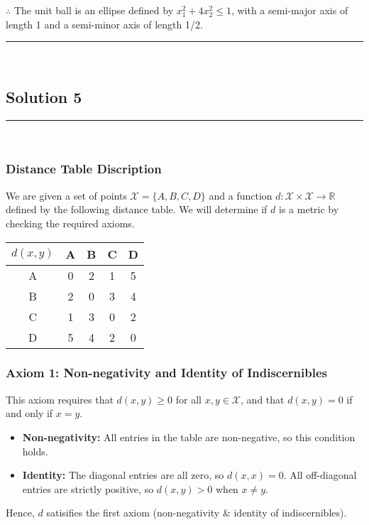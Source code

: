 \documentclass{article}
\begin{document}
\subsubsection*{\normalfont}{$\therefore$ The unit ball is an ellipse defined by $x_1^2 + 4x_2^2 \le 1$, with a semi-major axis of length 1 and a semi-minor axis of length 1/2.}

\noindent\rule{\textwidth}{0.4pt}\\

\newpage

\subsection*{Solution 5}
\noindent\rule{\textwidth}{0.4pt}\\
\subsubsection*{Distance Table Discription}
\parbox{\textwidth}{
We are given a set of points $\mathcal{X}=\{A, B, C, D\}$ and a function $d: \mathcal{X} \times \mathcal{X} \to \mathbb{R}$ defined by the following distance table. We will determine if $d$ is a metric by checking the required axioms.
}
\begin{center}
\renewcommand{\arraystretch}{1.2}
\begin{tabular}{c|cccc}
$d(x,y)$ & A & B & C & D \\
\hline
A & 0 & 2 & 1 & 5 \\
B & 2 & 0 & 3 & 4 \\
C & 1 & 3 & 0 & 2 \\
D & 5 & 4 & 2 & 0
\end{tabular}
\end{center}

\subsubsection*{Axiom 1: Non-negativity and Identity of Indiscernibles}
\parbox{\textwidth}{
This axiom requires that $d(x, y) \geq 0$ for all $x, y \in \mathcal{X}$, and that $d(x, y) = 0$ if and only if $x = y$.
\begin{itemize}
    \item \textbf{Non-negativity:} All entries in the table are non-negative, so this condition holds.
    \item \textbf{Identity:} The diagonal entries are all zero, so $d(x, x) = 0$. All off-diagonal entries are strictly positive, so $d(x, y) > 0$ when $x \neq y$.
\end{itemize}
Hence, $d$ satisifies the first axiom (non-negativity \& identity of indiscernibles).
}
\end{document}
